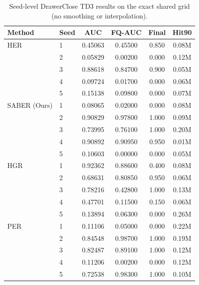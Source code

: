 \begin{table}[t]
\centering
\small
\setlength{\tabcolsep}{1pt}
\begin{tabular}{llcccc}
\toprule
Method & Seed & AUC & FQ-AUC & Final & Hit90 \\
\midrule
HER & 1 & 0.45063 & 0.45500 & 0.850 & 0.08M \\
 & 2 & 0.05829 & 0.00200 & 0.000 & 0.12M \\
 & 3 & 0.88618 & 0.84700 & 0.900 & 0.05M \\
 & 4 & 0.09724 & 0.01700 & 0.000 & 0.06M \\
 & 5 & 0.15138 & 0.09800 & 0.000 & 0.07M \\
\addlinespace[1pt]
SABER (Ours) & 1 & 0.08065 & 0.02000 & 0.000 & 0.08M \\
 & 2 & 0.90829 & 0.97800 & 1.000 & 0.09M \\
 & 3 & 0.73995 & 0.76100 & 1.000 & 0.20M \\
 & 4 & 0.90892 & 0.90950 & 0.950 & 0.01M \\
 & 5 & 0.10603 & 0.00000 & 0.000 & 0.05M \\
\addlinespace[1pt]
HGR & 1 & 0.92362 & 0.88600 & 0.400 & 0.08M \\
 & 2 & 0.68631 & 0.80850 & 0.950 & 0.06M \\
 & 3 & 0.78216 & 0.42800 & 1.000 & 0.13M \\
 & 4 & 0.47701 & 0.11500 & 0.150 & 0.06M \\
 & 5 & 0.13894 & 0.06300 & 0.000 & 0.26M \\
\addlinespace[1pt]
PER & 1 & 0.11106 & 0.05000 & 0.000 & 0.22M \\
 & 2 & 0.84548 & 0.98700 & 1.000 & 0.19M \\
 & 3 & 0.82487 & 0.89100 & 1.000 & 0.12M \\
 & 4 & 0.11206 & 0.00200 & 0.000 & 0.12M \\
 & 5 & 0.72538 & 0.98300 & 1.000 & 0.10M \\
\bottomrule
\end{tabular}
\caption{Seed-level DrawerClose TD3 results on the exact shared grid (no smoothing or interpolation).}
\label{tab:supp-seeds-drawer-close-td3}
\end{table}